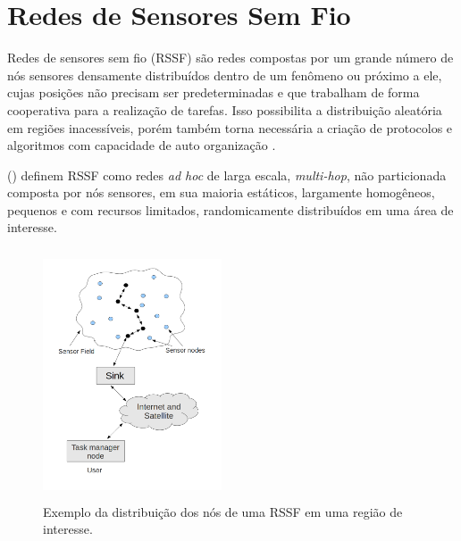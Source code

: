 \section{Redes de Sensores Sem Fio}

Redes de sensores sem fio (RSSF) são redes compostas por um grande número de nós sensores densamente distribuídos dentro de um fenômeno ou próximo a ele, cujas posições não precisam ser predeterminadas e que trabalham de forma cooperativa para a realização de tarefas. Isso possibilita a distribuição aleatória em regiões inacessíveis, porém também torna necessária a criação de protocolos e algoritmos com capacidade de auto organização \cite{Akyildiz2002}.

 (\citeyear{Romer2004}) definem RSSF como redes \textit{ad hoc} de larga escala, \textit{multi-hop}, não particionada composta por nós sensores, em sua maioria estáticos, largamente homogêneos, pequenos e com recursos limitados, randomicamente distribuídos em uma área de interesse.


\begin{figure}[!htb]
\centering
\includegraphics[width=200px,height=280px]{./Pictures/SensorNodesScatteredInASensorField.png}
\caption{Exemplo da distribuição dos nós de uma RSSF em uma região de interesse.} %
\label{fig:snsf} %
\end{figure}

